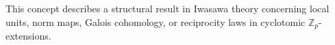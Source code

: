 This concept describes a structural result in Iwasawa theory concerning local units, norm maps, Galois cohomology, or reciprocity laws in cyclotomic $\mathbb{Z}_p$-extensions.
